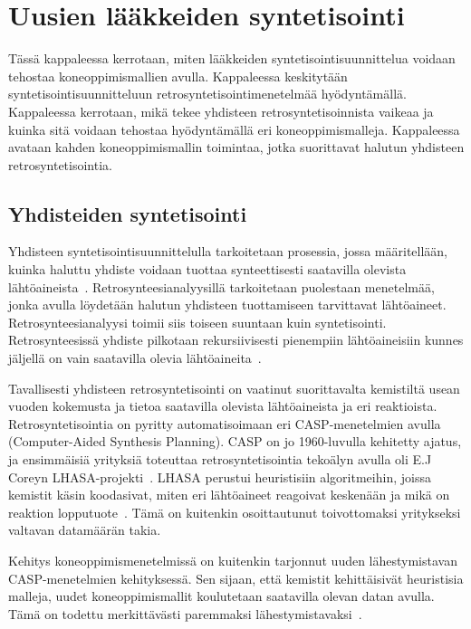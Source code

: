 \documentclass[finnish,twoside,censored,tkt,sw-line]{HYthesisML}
\begin{document}
\chapter{Uusien lääkkeiden syntetisointi}

Tässä kappaleessa kerrotaan, miten lääkkeiden syntetisointisuunnittelua voidaan tehostaa koneoppimismallien avulla.
Kappaleessa keskitytään syntetisointisuunnitteluun retrosyntetisointimenetelmää hyödyntämällä.
Kappaleessa kerrotaan, mikä tekee yhdisteen retrosyntetisoinnista vaikeaa ja kuinka sitä voidaan tehostaa hyödyntämällä eri koneoppimismalleja.
Kappaleessa avataan kahden koneoppimismallin toimintaa, jotka suorittavat halutun yhdisteen retrosyntetisointia.

\section{Yhdisteiden syntetisointi}

Yhdisteen syntetisointisuunnittelulla tarkoitetaan prosessia, jossa määritellään, kuinka haluttu yhdiste voidaan tuottaa synteettisesti saatavilla olevista lähtöaineista~\cite{ColeyConnorW2018MLiC}.
Retrosynteesianalyysillä tarkoitetaan puolestaan menetelmää, jonka avulla löydetään halutun yhdisteen tuottamiseen tarvittavat lähtöaineet.
Retrosynteesianalyysi toimii siis toiseen suuntaan kuin syntetisointi.
Retrosynteesissä yhdiste pilkotaan rekursiivisesti pienempiin lähtöaineisiin kunnes jäljellä on vain saatavilla olevia lähtöaineita~\cite{ECoreyRetrosynthesis}.

Tavallisesti yhdisteen retrosyntetisointi on vaatinut suorittavalta kemistiltä usean vuoden kokemusta ja tietoa saatavilla olevista lähtöaineista ja eri reaktioista.
Retrosyntetisointia on pyritty automatisoimaan eri CASP-menetelmien avulla (Computer-Aided Synthesis Planning).
CASP on jo 1960-luvulla kehitetty ajatus, ja ensimmäisiä yrityksiä toteuttaa retrosyntetisointia tekoälyn avulla oli E.J Coreyn LHASA-projekti~\cite{ColeyConnorW2018MLiC}.
LHASA perustui heuristisiin algoritmeihin, joissa kemistit käsin koodasivat, miten eri lähtöaineet reagoivat keskenään ja mikä on reaktion lopputuote~\cite{LHASA}.
Tämä on kuitenkin osoittautunut toivottomaksi yritykseksi valtavan datamäärän takia.

Kehitys koneoppimismenetelmissä on kuitenkin tarjonnut uuden lähestymistavan CASP-menetelmien kehityksessä.
Sen sijaan, että kemistit kehittäisivät heuristisia malleja, uudet koneoppimismallit koulutetaan saatavilla olevan datan avulla.
Tämä on todettu merkittävästi paremmaksi lähestymistavaksi~\cite{ColeyConnorW2018MLiC}.
\end{document}
